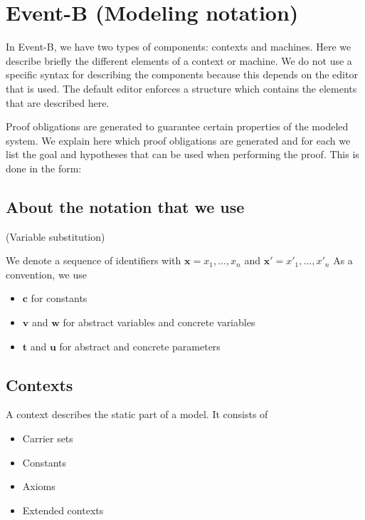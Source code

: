 \newcommand{\varlist}[1]{\textbf{#1}}
\newcommand{\allconstants}{\varlist{c}}
\newcommand{\absvariables}{\varlist{v}}
\newcommand{\concvariables}{\varlist{w}}
\newcommand{\allvariables}{{\absvariables,\concvariables}}
\newcommand{\absparameters}{\varlist{t}}
\newcommand{\concparameters}{\varlist{u}}
\newcommand{\allparameters}{{\absparameters,\concparameters}}

\section{Event-B (Modeling notation)}
\label{reference_02}

In Event-B, we have two types of components: contexts and machines.
Here we describe briefly the different elements of a context or machine.
We do not use a specific syntax for describing the components because this depends on the editor that is
used. The default editor enforces a structure which contains the elements that are described here.

Proof obligations are generated to guarantee certain properties of the modeled system.
We explain here which proof obligations are generated and for each we list the goal and hypotheses that can be used
when performing the proof.
This is done in the form:

\subsection{About the notation that we use}
(Variable substitution)

We denote a sequence of identifiers with $\varlist{x} = x_1,\ldots,x_n$ and $\varlist{x}' = x'_1,\ldots,x'_n$
As a convention, we use
\begin{itemize}
\item $\allconstants$ for constants
\item $\absvariables$ and $\concvariables$ for abstract variables and concrete variables
\item $\absparameters$ and $\concparameters$ for abstract and concrete parameters
\end{itemize}

\subsection{Contexts}
A context describes the static part of a model. It consists of
\begin{itemize}
\item Carrier sets
\item Constants
\item Axioms
\item Extended contexts
\end{itemize}

